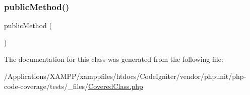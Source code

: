 \subsubsection{\texorpdfstring{public\+Method()}{publicMethod()}\hspace{0.1cm}{\footnotesize\ttfamily [2/2]}}
{\footnotesize\ttfamily public\+Method (\begin{DoxyParamCaption}{ }\end{DoxyParamCaption})}



The documentation for this class was generated from the following file\+:\begin{DoxyCompactItemize}
\item 
/\+Applications/\+X\+A\+M\+P\+P/xamppfiles/htdocs/\+Code\+Igniter/vendor/phpunit/php-\/code-\/coverage/tests/\+\_\+files/\mbox{\hyperlink{php-code-coverage_2tests_2__files_2_covered_class_8php}{Covered\+Class.\+php}}\end{DoxyCompactItemize}
